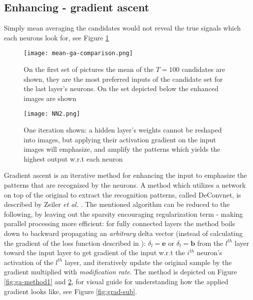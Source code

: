 \subsection{Enhancing - gradient ascent}

Simply mean averaging the candidates would not reveal the true signals which each neurons look for, see Figure \ref{fig:mean-ga-comp}

\begin{figure}
    \centering
    \texttt{[image: mean-ga-comparison.png]}
    \caption{On the first set of pictures the mean of the $T=100$ candidates are shown, they are the most preferred inputs of the candidate set for the last layer's neurons. On the set depicted below the enhanced images are shown}
    \label{fig:mean-ga-comp}
\end{figure}
\begin{figure}
    \centering
    \texttt{[image: NN2.png]}
    \caption{One iteration shown: a hidden layer's weights cannot be reshaped into images, but applying their activation gradient on the input images will emphasize, and amplify the patterns which yields the highest output w.r.t each neuron}
    \label{fig:ga-method2}
\end{figure}
Gradient ascent is an iterative method for enhancing the input to emphasize the patterns that are recognized by the neurons. A method which utilizes a network on top of the original to extract the recognition patterns, called DeConvnet, is described by Zeiler \emph{et al.} \cite{zeiler2014visualizing}. The mentioned algorithm can be reduced to the following, by leaving out the sparsity encouraging regularization term - making parallel processing more efficient:
for fully connected layers the method boils down to backward propagating an \emph{arbitrary} delta vector (instead of calculating the gradient of the loss function described in \cite{zeiler2014visualizing}): 
$\delta_l = \mathbf{e}$ or $\delta_l =\mathbf{b}$
from the $l^{th}$ layer toward the input layer to get gradient of the input w.r.t the $i^{th}$ neuron's activation of the $l^{th}$ layer, and iteratively update the original sample by the gradient multiplied with \emph{modification rate}. The method is depicted on Figure \ref{fig:ga-method1} and \ref{fig:ga-method2}, 
for visual guide for understanding how the applied gradient looks like, see Figure \ref{fig:grad-sub}.

